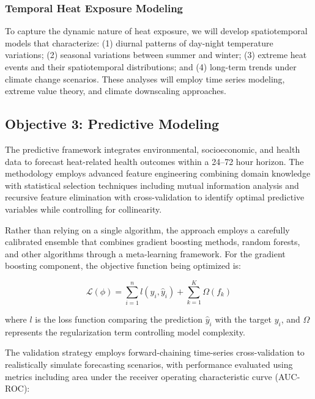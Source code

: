 \subsubsection{Temporal Heat Exposure Modeling}
To capture the dynamic nature of heat exposure, we will develop spatiotemporal models that characterize: (1) diurnal patterns of day-night temperature variations; (2) seasonal variations between summer and winter; (3) extreme heat events and their spatiotemporal distributions; and (4) long-term trends under climate change scenarios. These analyses will employ time series modeling, extreme value theory, and climate downscaling approaches.

\subsection{Objective 3: Predictive Modeling}
The predictive framework integrates environmental, socioeconomic, and health data to forecast heat-related health outcomes within a 24--72 hour horizon. The methodology employs advanced feature engineering combining domain knowledge with statistical selection techniques including mutual information analysis and recursive feature elimination with cross-validation to identify optimal predictive variables while controlling for collinearity.

Rather than relying on a single algorithm, the approach employs a carefully calibrated ensemble that combines gradient boosting methods, random forests, and other algorithms through a meta-learning framework. For the gradient boosting component, the objective function being optimized is:

\begin{equation}
\mathcal{L}(\phi) = \sum^n_{i=1} l(y_i, \hat{y}_i) + \sum^K_{k=1} \Omega(f_k)
\end{equation}

where $l$ is the loss function comparing the prediction $\hat{y}_i$ with the target $y_i$, and $\Omega$ represents the regularization term controlling model complexity.

The validation strategy employs forward-chaining time-series cross-validation to realistically simulate forecasting scenarios, with performance evaluated using metrics including area under the receiver operating characteristic curve (AUC-ROC):

